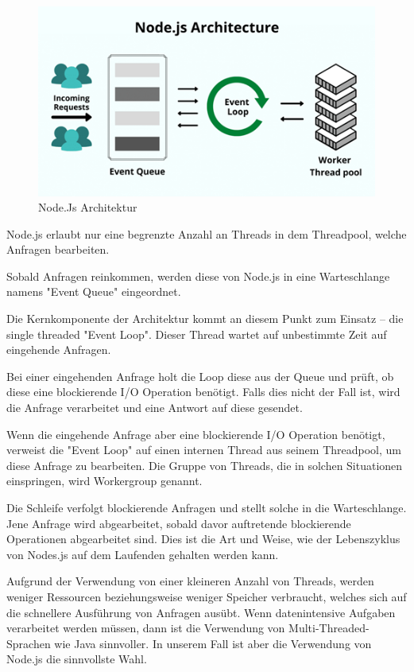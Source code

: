 \begin{figure}[H]
    \centering
    \includegraphics{media/NodeJs/NodeJsArchitektur.png}
    \caption{Node.Js Architektur\cite{ArchitekturFoto}}
\end{figure}


Node.js erlaubt nur eine begrenzte Anzahl an Threads in dem Threadpool, welche Anfragen bearbeiten.

Sobald Anfragen reinkommen, werden diese von Node.js in eine Warteschlange namens "Event Queue" eingeordnet. 

Die Kernkomponente der Architektur kommt an diesem Punkt zum Einsatz – die single threaded "Event Loop". Dieser Thread wartet auf unbestimmte Zeit auf eingehende Anfragen.

Bei einer eingehenden Anfrage holt die Loop diese aus der Queue und prüft, ob diese eine blockierende I/O Operation benötigt. Falls dies nicht der Fall ist, wird die Anfrage verarbeitet und eine Antwort auf diese gesendet. 

Wenn die eingehende Anfrage aber eine blockierende I/O Operation benötigt, verweist die "Event Loop" auf einen internen Thread aus seinem Threadpool, um diese Anfrage zu bearbeiten. Die Gruppe von Threads, die in solchen Situationen einspringen, wird Workergroup genannt.

Die Schleife verfolgt blockierende Anfragen und stellt solche in die Warteschlange. Jene Anfrage wird abgearbeitet, sobald davor auftretende blockierende Operationen abgearbeitet sind. Dies ist die Art und Weise, wie der Lebenszyklus von Nodes.js auf dem Laufenden gehalten werden kann.

Aufgrund der Verwendung von einer kleineren Anzahl von Threads, werden weniger Ressourcen beziehungsweise weniger Speicher verbraucht, welches sich auf die schnellere Ausführung von Anfragen ausübt. Wenn datenintensive Aufgaben verarbeitet werden müssen, dann ist die Verwendung von Multi-Threaded-Sprachen wie Java sinnvoller. In unserem Fall ist aber die Verwendung von Node.js die sinnvollste Wahl. \cite{Arocom}

